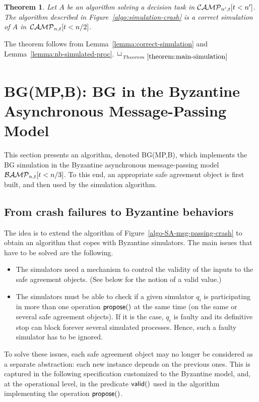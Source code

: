 \documentclass[11pt,letterpaper]{article}
\newtheorem{theorem}{Theorem}
\newlength {\afterproof}
\newcommand{\toto}{xxx}
\newenvironment{proofT}{\noindent{\bf Proof }}
{\hspace*{\fill}$\Box_{\mathit{Theorem}~\ref{\toto}}$\par\vspace{\afterproof}}
\newcommand{\CM}{{\cal CAMP}_{n,t}}
\newcommand{\CMprim}{{\cal CAMP}_{n',t}}
\newcommand{\BM}{{\cal BAMP}_{n,t}}
\begin{document}
\begin{theorem}
\label{theorem:main-simulation}
Let $A$ be an algorithm solving a decision task in $\CMprim[t<n']$.
The algorithm described in Figure~\ref{algo:simulation-crash} is a
correct simulation of $A$ in~$\CM[t<n/2]$.
\end{theorem}

\begin{proofT}
The theorem follows from  Lemma~\ref{lemma:correct-simulation} and Lemma~\ref{lemma:nb-simulated-proc}.
\renewcommand{\toto}{theorem:main-simulation}
\end{proofT}




\section{BG(MP,B): BG in the Byzantine Asynchronous Message-Passing  Model}
\label{sec:BG-byzantine-model}

This section presents an algorithm, denoted BG(MP,B), which implements the BG
simulation in the Byzantine asynchronous message-passing model $\BM[t<n/3]$.
To this end, an appropriate  safe agreement object is first built, and then
used by the simulation algorithm.



\subsection{From crash failures to Byzantine behaviors}
The idea is to extend the algorithm of Figure~\ref{algo-SA-msg-passing-crash}
to obtain an algorithm that copes with Byzantine simulators.
The main issues that have to be solved are the following.
\begin{itemize}
\vspace{-0.2cm}
\item
The simulators  need a  mechanism to  control the  validity of the inputs
to the safe agreement objects. (See below for the notion of a valid value.)
\vspace{-0.2cm}
\item
The simulators must be able to check if a given simulator $q_i$ is
participating in more than one operation ${\sf propose}()$ at the same time
(on the same or several safe agreement objects).
If it is the case, $q_i$ is faulty and its definitive stop  can block forever
several simulated processes. Hence, such a faulty simulator has to be ignored.
\end{itemize}
To solve these issues, each safe agreement object may no longer be considered
as a separate abstraction: each new instance depends on the previous ones. This
is captured in the following specification customized to the Byzantine
model, and, at the operational level, in the predicate ${\sf valid}()$
used in the algorithm implementing the operation ${\sf propose}()$.
\end{document}
